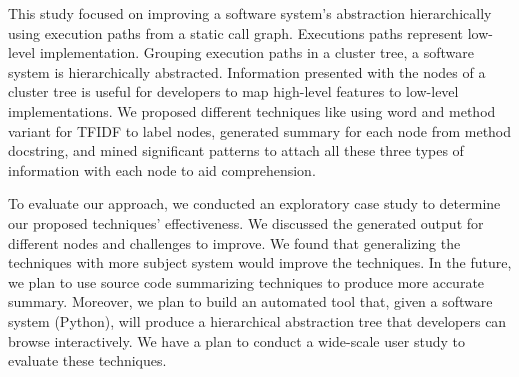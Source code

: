 This study focused on improving a software system's abstraction hierarchically using execution paths from a static call graph. Executions paths represent low-level implementation. Grouping execution paths in a cluster tree, a software system is hierarchically abstracted. Information presented with the nodes of a cluster tree is useful for developers to map high-level features to low-level implementations. We proposed different techniques like using word and method variant for TFIDF to label nodes, generated summary for each node from method docstring, and mined significant patterns to attach all these three types of information with each node to aid comprehension.

To evaluate our approach, we conducted an exploratory case study to determine our proposed techniques' effectiveness. We discussed the generated output for different nodes and challenges to improve. We found that generalizing the techniques with more subject system would improve the techniques. In the future, we plan to use source code summarizing techniques to produce more accurate summary. Moreover, we plan to build an automated tool that, given a software system (Python), will produce a hierarchical abstraction tree that developers can browse interactively. We have a plan to conduct a wide-scale user study to evaluate these techniques.
